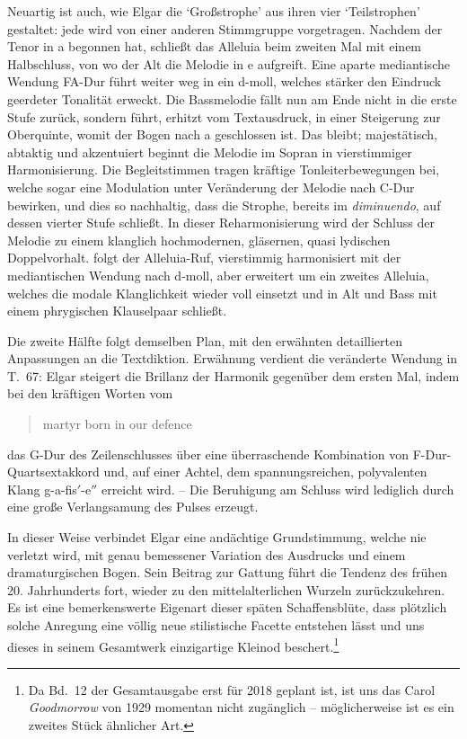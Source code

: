 \documentclass[a4paper,11pt,open=any]{scrbook}
\newcommand{\engquote}[1]{\foreignblockquote{english}{#1}}
\begin{document}
Neuartig ist auch, wie Elgar die \enquote*{Großstrophe} aus ihren
vier \enquote*{Teilstrophen} gestaltet: jede wird von einer anderen
Stimmgruppe vorgetragen.  Nachdem der Tenor in \textsf{a} begonnen hat,
schließt das Alleluia beim zweiten Mal mit einem Halbschluss, von wo der
Alt die Melodie in \textsf{e} aufgreift.  Eine aparte mediantische Wendung
F\textrightarrow{}A-Dur führt weiter weg in ein d-moll, welches stärker den
Eindruck geerdeter Tonalität erweckt.  Die Bassmelodie fällt nun am Ende
nicht in die erste Stufe zurück, sondern führt, erhitzt vom Textausdruck,
in einer Steigerung zur Oberquinte, womit der Bogen nach \textsf{a}
geschlossen ist.  Das  bleibt; majestätisch, abtaktig
und akzentuiert beginnt die Melodie im Sopran in vierstimmiger
Harmonisierung.  Die Begleitstimmen tragen kräftige Tonleiterbewegungen
bei, welche sogar eine Modulation unter Veränderung der Melodie nach
C-Dur bewirken, und dies so nachhaltig, dass die Strophe, bereits im
\textit{diminuendo}, auf dessen vierter Stufe schließt.  In dieser
Reharmonisierung wird der Schluss der Melodie zu einem klanglich hochmodernen,
gläsernen, quasi lydischen Doppelvorhalt.   folgt der
Alleluia-Ruf, vierstimmig harmonisiert mit der mediantischen Wendung
nach d-moll, aber erweitert um ein zweites Alleluia, welches die modale
Klanglichkeit wieder voll einsetzt und in Alt und Bass mit einem phrygischen
Klauselpaar schließt.

Die zweite Hälfte folgt demselben Plan, mit den erwähnten detaillierten
Anpassungen an die Textdiktion.  Erwähnung verdient die veränderte Wendung
in T.~67: Elgar steigert die Brillanz der Harmonik gegenüber dem ersten
Mal, indem bei den kräftigen Worten vom \engquote{martyr born in our defence}
das G-Dur des Zeilenschlusses über eine überraschende Kombination von
F-Dur-Quartsextakkord und, auf einer Achtel, dem spannungsreichen, polyvalenten
Klang \textsf{g-a-fis$'$-e$''$} erreicht wird. – Die Beruhigung am Schluss
wird lediglich durch eine große Verlangsamung des Pulses erzeugt.

In dieser Weise verbindet Elgar eine andächtige Grundstimmung, welche
nie verletzt wird, mit genau bemessener Variation des Ausdrucks und
einem dramaturgischen Bogen.  Sein Beitrag zur Gattung führt die
Tendenz des frühen 20. Jahrhunderts fort, wieder zu den mittelalterlichen
Wurzeln zurückzukehren.  Es ist eine bemerkenswerte Eigenart dieser späten
Schaffensblüte, dass plötzlich solche Anregung eine völlig neue stilistische
Facette entstehen lässt und uns dieses in seinem Gesamtwerk einzigartige
Kleinod beschert.\footnote{Da Bd.~12 der Gesamtausgabe erst für 2018
geplant ist, ist uns das Carol \textit{Goodmorrow} von 1929 momentan
nicht zugänglich – möglicherweise ist es ein zweites Stück ähnlicher Art.}
\end{document}
